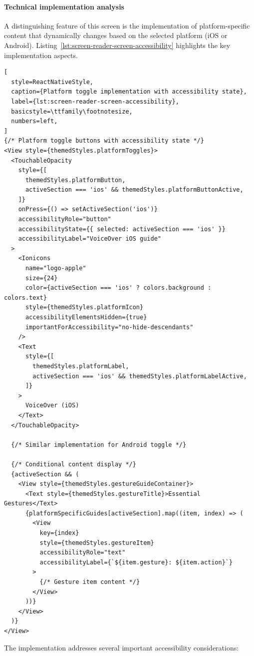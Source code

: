 \paragraph{Technical implementation analysis}

A distinguishing feature of this screen is the implementation of platform-specific content that dynamically changes based on the selected platform (iOS or Android). Listing~\ref{lst:screen-reader-screen-accessibility} highlights the key implementation aspects.

\begin{lstlisting}[
  style=ReactNativeStyle,
  caption={Platform toggle implementation with accessibility state},
  label={lst:screen-reader-screen-accessibility},
  basicstyle=\ttfamily\footnotesize,
  numbers=left,
]
{/* Platform toggle buttons with accessibility state */}
<View style={themedStyles.platformToggles}>
  <TouchableOpacity
    style={[
      themedStyles.platformButton,
      activeSection === 'ios' && themedStyles.platformButtonActive,
    ]}
    onPress={() => setActiveSection('ios')}
    accessibilityRole="button"
    accessibilityState={{ selected: activeSection === 'ios' }}
    accessibilityLabel="VoiceOver iOS guide"
  >
    <Ionicons
      name="logo-apple"
      size={24}
      color={activeSection === 'ios' ? colors.background : colors.text}
      style={themedStyles.platformIcon}
      accessibilityElementsHidden={true}
      importantForAccessibility="no-hide-descendants"
    />
    <Text
      style={[
        themedStyles.platformLabel,
        activeSection === 'ios' && themedStyles.platformLabelActive,
      ]}
    >
      VoiceOver (iOS)
    </Text>
  </TouchableOpacity>
  
  {/* Similar implementation for Android toggle */}
  
  {/* Conditional content display */}
  {activeSection && (
    <View style={themedStyles.gestureGuideContainer}>
      <Text style={themedStyles.gestureTitle}>Essential Gestures</Text>
      {platformSpecificGuides[activeSection].map((item, index) => (
        <View
          key={index}
          style={themedStyles.gestureItem}
          accessibilityRole="text"
          accessibilityLabel={`${item.gesture}: ${item.action}`}
        >
          {/* Gesture item content */}
        </View>
      ))}
    </View>
  )}
</View>
\end{lstlisting}

The implementation addresses several important accessibility considerations:

